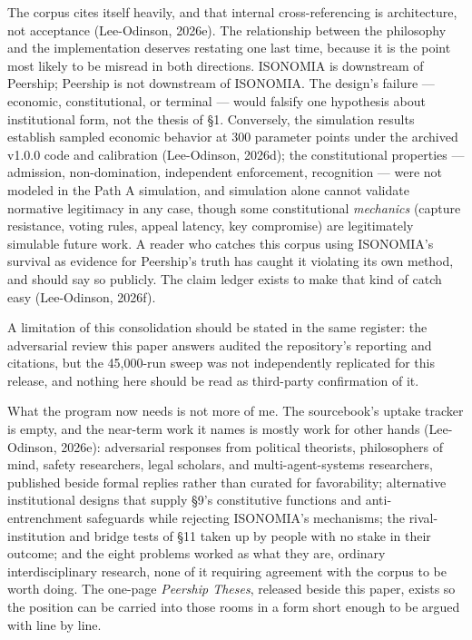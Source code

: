 \documentclass[
  11pt,
  letterpaper,
]{article}
\begin{document}
The corpus cites itself heavily, and that internal cross-referencing is
architecture, not acceptance (Lee-Odinson, 2026e). The relationship
between the philosophy and the implementation deserves restating one
last time, because it is the point most likely to be misread in both
directions. ISONOMIA is downstream of Peership; Peership is not
downstream of ISONOMIA. The design's failure --- economic,
constitutional, or terminal --- would falsify one hypothesis about
institutional form, not the thesis of §1. Conversely, the simulation
results establish sampled economic behavior at 300 parameter points
under the archived v1.0.0 code and calibration (Lee-Odinson, 2026d); the
constitutional properties --- admission, non-domination, independent
enforcement, recognition --- were not modeled in the Path A simulation,
and simulation alone cannot validate normative legitimacy in any case,
though some constitutional \emph{mechanics} (capture resistance, voting
rules, appeal latency, key compromise) are legitimately simulable future
work. A reader who catches this corpus using ISONOMIA's survival as
evidence for Peership's truth has caught it violating its own method,
and should say so publicly. The claim ledger exists to make that kind of
catch easy (Lee-Odinson, 2026f).

A limitation of this consolidation should be stated in the same
register: the adversarial review this paper answers audited the
repository's reporting and citations, but the 45,000-run sweep was not
independently replicated for this release, and nothing here should be
read as third-party confirmation of it.

What the program now needs is not more of me. The sourcebook's uptake
tracker is empty, and the near-term work it names is mostly work for
other hands (Lee-Odinson, 2026e): adversarial responses from political
theorists, philosophers of mind, safety researchers, legal scholars, and
multi-agent-systems researchers, published beside formal replies rather
than curated for favorability; alternative institutional designs that
supply §9's constitutive functions and anti-entrenchment safeguards
while rejecting ISONOMIA's mechanisms; the rival-institution and bridge
tests of §11 taken up by people with no stake in their outcome; and the
eight problems worked as what they are, ordinary interdisciplinary
research, none of it requiring agreement with the corpus to be worth
doing. The one-page \emph{Peership Theses}, released beside this paper,
exists so the position can be carried into those rooms in a form short
enough to be argued with line by line.
\end{document}
